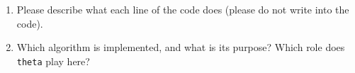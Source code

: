 \begin{center}
	\vspace*{-0.5cm}
	\begin{minipage}{0.8\textwidth}
	
\end{minipage}
\end{center}
\begin{enumerate}
	\item Please describe what each line of the code does (please do not write into the code).
	\item Which algorithm is implemented, and what is its purpose? Which role does \verb|theta| play here?
\end{enumerate}

